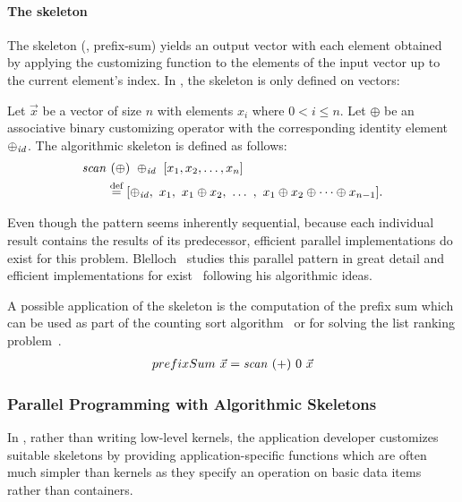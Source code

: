 \paragraph{The \scan skeleton}
The \scan skeleton (\aka, prefix-sum) yields an output vector with each element obtained by applying the customizing function to the elements of the input vector up to the current element's index.
In \SkelCL, the \scan skeleton is only defined on vectors:
\begin{definition}
  \label{definition:scan}
  Let $\vec{x}$ be a vector of size $n$ with elements $x_i$ where $0 < i \leq n$.
  Let $\oplus$ be an associative binary customizing operator with the corresponding identity element $\oplus_{\text{\textit{id}}}$.
  The algorithmic skeleton \scan is defined as follows:
  \begin{equation*}
    \begin{split}
      \text{\textit{scan}}&\ (\oplus)\ \oplus_{\text{\textit{id}}}\ [x_1, x_2, \dots, x_n] \\
      &\stackrel{\textrm{\scriptsize def}}{=} [\oplus_{\text{\textit{id}}},\ x_1,\ x_1 \oplus x_2,\ \dots\ ,\ x_1 \oplus x_2 \oplus \cdots \oplus x_{n-1}] .
    \end{split}
  \end{equation*}
\end{definition}
\noindent
Even though the \scan pattern seems inherently sequential, because each individual result contains the results of its predecessor, efficient parallel implementations do exist for this problem.
Blelloch~\cite{Blelloch1991} studies this parallel pattern in great detail and efficient implementations for \GPUs exist~\cite{HarrisSeOw2007} following his algorithmic ideas.

A possible application of the \scan skeleton is the computation of the prefix sum which can be used as part of the counting sort algorithm~\cite{Knuth1998} or for solving the list ranking problem~\cite{ColeVi1989}.
\begin{align*}
  prefixSum\ \vec{x} = \text{\textit{scan}}\ (+)\ 0\ \vec{x}
\end{align*}

\subsubsection{Parallel Programming with Algorithmic Skeletons}
In \SkelCL, rather than writing low-level kernels, the application developer customizes suitable skeletons by providing application-specific functions which are often much simpler than kernels as they specify an operation on basic data items rather than containers.

